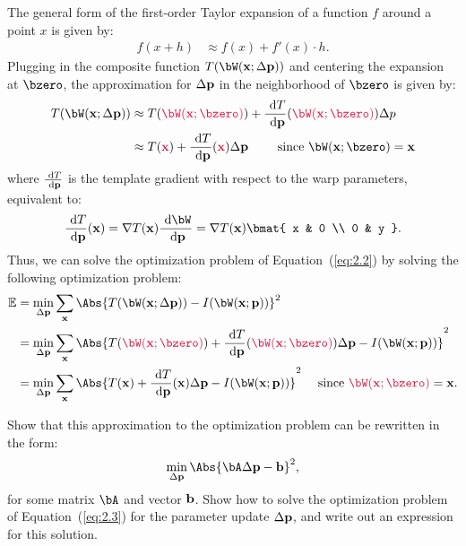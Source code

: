 \begin{problem}
\begin{enumroman}
      \begin{answer}
        The general form of the first-order Taylor expansion of a function
        $f$ around a point $x$ is given by:
        \begin{align*}
          f(x + h) &\approx f(x) + f'(x) \cdot h.
        \end{align*}
        Plugging in the composite function $T(\bW(\bx; \Delta \bp))$ and centering
        the expansion at $\bzero$, the approximation for
        $\Delta \mathbf{p}$ in the neighborhood of $\bzero$ is given by:
        \begin{align*}
          T(\bW(\bx; \Delta \bp)) &\approx
          T(\crim{\bW(\bx; \bzero)}) + \frac{\d T}{\d \bp}(\crim{\bW(\bx; \bzero)}) \Delta p \\
          &\approx T(\crim{\bx}) + \frac{\d T}{\d \bp}(\crim{\bx}) \Delta \bp
          \qquad \text{ since } \bW(\bx; \bzero) = \bx
        \end{align*}
        where $\frac{\text{ d} T}{\text{ d} \mathbf{p}}$ is the template gradient with respect to the warp parameters,
        equivalent to:
        \[
          \frac{\d T}{\d \bp}(\bx) = \nabla T(\bx) \frac{\d \bW}{\d \bp}
          = \nabla T(\bx) \bmat{ x & 0 \\ 0 & y }.
        \]
        Thus, we can solve the optimization problem of Equation~(\ref{eq:2.2})
        by solving the following optimization problem:
        \begin{align*}
          \mathbb{E} &= \min_{\Delta \bp} \sum_\bx \Abs{T(\bW(\bx; \Delta \bp)) - I(\bW(\bx; \bp))}^2 \\
                     &= \min_{\Delta \bp} \sum_\bx \Abs{T(\crim{\bW(\bx; \bzero)}) +
                     \frac{\d T}{\d \bp}(\crim{\bW(\bx; \bzero)}) \Delta \bp - I(\bW(\bx; \bp))}^2 \\
                     &= \min_{\Delta \bp} \sum_\bx \Abs{T(\bx) + \frac{\d T}{\d \bp}(\bx)
                     \Delta \bp - I(\bW(\bx; \bp))}^2 \quad \text{ since $\crim{\bW(\bx; \bzero)} = \bx$}.
          \label{eq:ans:2.2}
        \end{align*}
      \end{answer}

      \newpage
    \item Show that this approximation to the optimization problem can be rewritten
      in the form:
      \begin{equation}
        \min_{\Delta \bp} \Abs{\bA \Delta \bp - \bb}^2,
        \label{eq:2.3}
      \end{equation}
      for some matrix $\bA$ and vector $\mathbf{b}$.
      Show how to solve the optimization problem of Equation~(\ref{eq:2.3})
      for the parameter update $\Delta \mathbf{p}$, and write out an expression
      for this solution.


\end{enumroman}
\end{problem}
